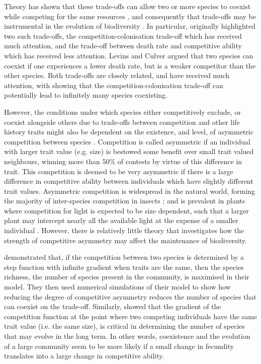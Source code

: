 Theory has shown that these trade-offs can allow two or more species to coexist while competing for the same resources  \citep[e.g.][]{kisdi2003coexistence, levins1971regional, bonsall2004life}, and consequently that trade-offs may be instrumental in the evolution of biodiversity \citep{schluter1995adaptive, white2005adaptive, bonsall2004life}. In particular, \cite{levins1971regional} originally highlighted two such trade-offs, the competition-colonisation trade-off which has received much attention, and the trade-off between death rate and competitive ability which has received less attention. Levins and Culver argued that two species can coexist if one experiences a lower death rate, but is a weaker competitor than the other species. Both trade-offs are closely related, and have received much attention, with \cite{tilman1994competition} showing that the competition-colonisation trade-off can potentially lead to infinitely many species coexisting.

However, the conditions under which species either competitively exclude, or coexist alongside others due to trade-offs between competition and other life history traits might also be dependent on the existence, and level, of asymmetric competition between species \citep{adler2000space}. Competition is called asymmetric if an individual with larger trait value (e.g. size) is bestowed some benefit over small trait valued neighbours, winning more than 50\% of contests by virtue of this difference in trait. This competition is deemed to be very asymmetric if there is a large difference in competitive ability between individuals which have slightly different trait values. Asymmetric competition is widespread in the natural world, forming the majority of inter-species competition in insects \citep{lawton1981asymmetrical}; and is prevalent in plants where competition for light is expected to be size dependent, such that a larger plant may intercept nearly all the available light at the expense of a smaller individual \citep{weiner1990asymmetric}. However, there is relatively little theory that investigates how the strength of competitive asymmetry may affect the maintenance of biodiversity.

\cite{adler2000space} demonstrated that, if the competition between two species is determined by a step function with infinite gradient when traits are the same, then the species richness, the number of species present in the community, is maximised in their model. They then used numerical simulations of their model to show how reducing the degree of competitive asymmetry reduces the number of species that can coexist on the trade-off. Similarly,  \cite{kisdi1999evolutionary} showed that the gradient of the competition function at the point where two competing individuals have the same trait value (i.e. the same size), is critical in determining the number of species that may evolve in the long term. In other words, coexistence and the evolution of a large community seem to be more likely if a small change in fecundity translates into a large change in competitive ability.

